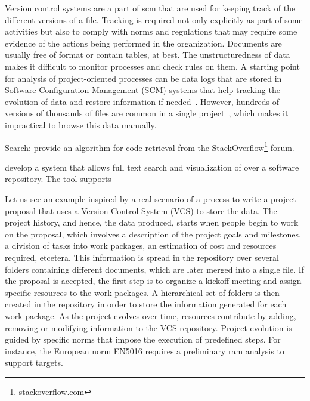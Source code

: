 Version control systems are a part of \gls{scm} that are used for keeping track of the different versions of a file. 
Tracking is required not only explicitly as part of some activities but also to comply with norms and regulations that may require some evidence of the actions being performed in the organization. Documents are usually free of format or contain tables, at best. The unstructuredness of data makes it difficult to monitor processes and check rules on them. A starting point for analysis of project-oriented processes can be data logs %
that are stored in Software Configuration Management (SCM) systems that help tracking the evolution of data and restore information if needed~\citep{voinea_open_2006}.
However, hundreds of versions of thousands of files are common in a single project~\citep{voinea_multiscale_2006}, which makes it impractical to browse this data manually.


Search:
\citep{DBLP:journals/spe/HuPZXGY20} provide an algorithm for code retrieval from the StackOverflow\footnote{stackoverflow.com} forum.

\citep{DBLP:conf/vissoft/FeinerA18} develop a system that allows full text search and visualization of over a software repository. The tool supports 

Let us see an example inspired by a real scenario of a process to write a project proposal that uses a Version Control System (VCS) to store the data. The project history, and hence, the data produced, starts when people begin to work on the proposal, which involves a description of the project goals and milestones, a division of tasks into work packages, an estimation of cost and resources required, etcetera. This information is spread in the repository over several folders containing different documents, which are later merged into a single file. If the proposal is accepted, the first step is to organize a kickoff meeting and assign specific resources to the work packages. A hierarchical set of folders is then created in the repository in order to store the information generated for each work package. As the project evolves over time, resources contribute by adding, removing or modifying information to the VCS repository. %
Project evolution is guided by specific norms that impose the execution of predefined steps. For instance, the European norm EN5016 requires a preliminary \gls{ram} analysis to support targets. 

